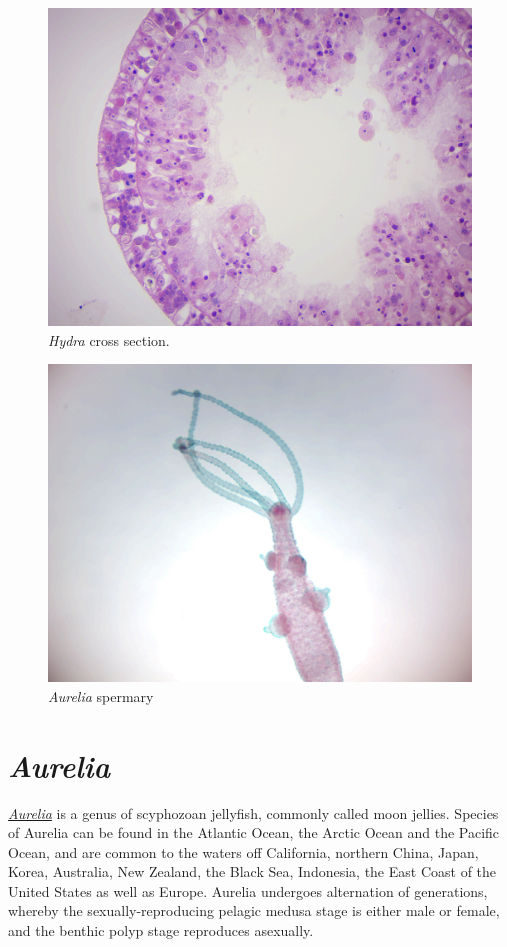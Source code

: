 \begin{figure}

{\centering \includegraphics[width=0.7\linewidth]{./figures/porifera/hydra_xs}

}

\caption{\emph{Hydra} cross section.}\label{fig:hydraxs}
\end{figure}

\begin{figure}

{\centering \includegraphics[width=0.7\linewidth]{./figures/porifera/hydra_spermary}

}

\caption{\emph{Aurelia} spermary}\label{fig:spermary}
\end{figure}

\section{\texorpdfstring{\emph{Aurelia}}{Aurelia}}\label{aurelia}

\href{https://en.wikipedia.org/wiki/Aurelia_(name)}{\emph{Aurelia}} is a genus
of scyphozoan jellyfish, commonly called moon jellies. Species of
Aurelia can be found in the Atlantic Ocean, the Arctic Ocean and the
Pacific Ocean, and are common to the waters off California, northern
China, Japan, Korea, Australia, New Zealand, the Black Sea, Indonesia,
the East Coast of the United States as well as Europe. Aurelia undergoes
alternation of generations, whereby the sexually-reproducing pelagic
medusa stage is either male or female, and the benthic polyp stage
reproduces asexually.


